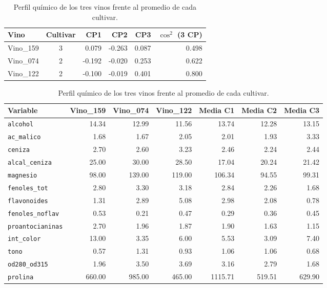 \documentclass[11pt,a4paper]{article}
\begin{document}
\begin{table}[H]
\centering\small
\caption{Coordenadas de tres vinos concretos y su calidad de representación en el espacio de 3 componentes.}
\begin{tabular}{lcrrrr}
\toprule
Vino & Cultivar & CP1 & CP2 & CP3 & $\cos^2$ (3 CP) \\
\midrule
Vino\_159 & 3 & 0.079 & -0.263 & 0.087 & 0.498 \\
Vino\_074 & 2 & -0.192 & -0.020 & 0.253 & 0.622 \\
Vino\_122 & 2 & -0.100 & -0.019 & 0.401 & 0.800 \\
\bottomrule
\end{tabular}

\vspace{6pt}
\begin{tabular}{lrrrrrr}
\toprule
Variable & Vino\_159 & Vino\_074 & Vino\_122 & Media C1 & Media C2 & Media C3 \\
\midrule
\texttt{alcohol} & 14.34 & 12.99 & 11.56 & 13.74 & 12.28 & 13.15 \\
\texttt{ac\_malico} & 1.68 & 1.67 & 2.05 & 2.01 & 1.93 & 3.33 \\
\texttt{ceniza} & 2.70 & 2.60 & 3.23 & 2.46 & 2.24 & 2.44 \\
\texttt{alcal\_ceniza} & 25.00 & 30.00 & 28.50 & 17.04 & 20.24 & 21.42 \\
\texttt{magnesio} & 98.00 & 139.00 & 119.00 & 106.34 & 94.55 & 99.31 \\
\texttt{fenoles\_tot} & 2.80 & 3.30 & 3.18 & 2.84 & 2.26 & 1.68 \\
\texttt{flavonoides} & 1.31 & 2.89 & 5.08 & 2.98 & 2.08 & 0.78 \\
\texttt{fenoles\_noflav} & 0.53 & 0.21 & 0.47 & 0.29 & 0.36 & 0.45 \\
\texttt{proantocianinas} & 2.70 & 1.96 & 1.87 & 1.90 & 1.63 & 1.15 \\
\texttt{int\_color} & 13.00 & 3.35 & 6.00 & 5.53 & 3.09 & 7.40 \\
\texttt{tono} & 0.57 & 1.31 & 0.93 & 1.06 & 1.06 & 0.68 \\
\texttt{od280\_od315} & 1.96 & 3.50 & 3.69 & 3.16 & 2.79 & 1.68 \\
\texttt{prolina} & 660.00 & 985.00 & 465.00 & 1115.71 & 519.51 & 629.90 \\
\bottomrule
\end{tabular}
\caption*{Perfil químico de los tres vinos frente al promedio de cada cultivar.}
\end{table}
\end{document}
